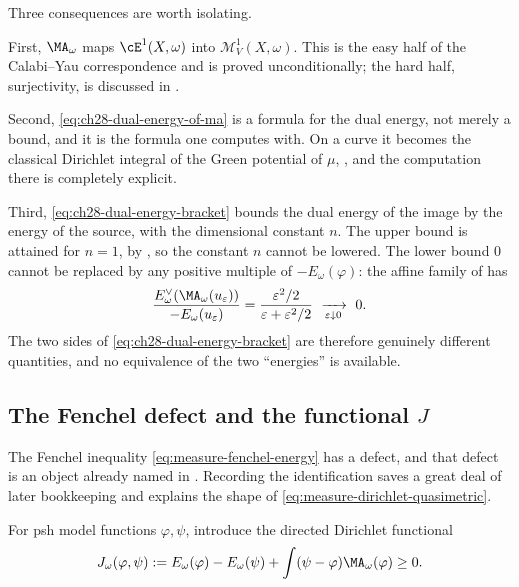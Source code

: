 \begin{remark}
\label{rem:ch28-reading-dual-of-ma}
Three consequences are worth isolating.

First, \(\MA_\omega\) maps \(\cE^1(X,\omega)\) into
\(\mathcal M^1_V(X,\omega)\).  This is the easy half of the Calabi--Yau
correspondence and is proved unconditionally; the hard half, surjectivity,
is discussed in .

Second, \eqref{eq:ch28-dual-energy-of-ma} is a formula for the dual energy,
not merely a bound, and it is the formula one computes with.  On a curve it
becomes the classical Dirichlet integral of the Green potential of \(\mu\),
, and the computation there is completely
explicit.

Third, \eqref{eq:ch28-dual-energy-bracket} bounds the dual energy of the
image by the energy of the source, with the dimensional constant \(n\).  The
upper bound is attained for \(n=1\), by
, so the constant \(n\) cannot be
lowered.  The lower bound \(0\) cannot be replaced by any positive multiple
of \(-E_\omega(\varphi)\): the affine family of
 has
\[
 \frac{E^\vee_\omega(\MA_\omega(u_\varepsilon))}
      {-E_\omega(u_\varepsilon)}
 =\frac{\varepsilon^2/2}{\varepsilon+\varepsilon^2/2}
 \ \xrightarrow[\varepsilon\downarrow0]{}\ 0 .
\]
The two sides of \eqref{eq:ch28-dual-energy-bracket} are therefore genuinely
different quantities, and no equivalence of the two ``energies'' is
available.
\end{remark}

\subsection{The Fenchel defect and the functional \texorpdfstring{\(J\)}{J}}
\label{sec:ch28-fenchel-defect}

The Fenchel inequality \eqref{eq:measure-fenchel-energy} has a defect, and
that defect is an object already named in .  Recording
the identification saves a great deal of later bookkeeping and explains the
shape of \eqref{eq:measure-dirichlet-quasimetric}.

For psh model functions \(\varphi,\psi\), introduce the directed Dirichlet
functional
\begin{equation}
\label{eq:directed-dirichlet-functional}
 J_\omega(\varphi,\psi)
 :=E_\omega(\varphi)-E_\omega(\psi)
   +\int(\psi-\varphi)\MA_\omega(\varphi)\geq0.
\end{equation}

